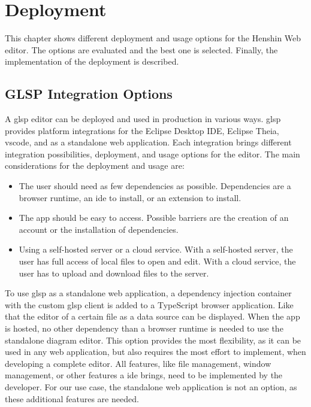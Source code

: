 \chapter{Deployment}
\label{sec:deployment}

This chapter shows different deployment and usage options for the Henshin Web editor. The options are evaluated and the best one is selected. Finally, the implementation of the deployment is described.

\section{GLSP Integration Options}
\label{sec:integration-options}
A \ac{glsp} editor can be deployed and used in production in various ways. \ac{glsp} provides platform integrations for the Eclipse Desktop IDE, Eclipse Theia, \ac{vscode}, and as a standalone web application. Each integration brings different integration possibilities, deployment, and usage options for the editor. \cite{glsp-doc} The main considerations for the deployment and usage are:
  \begin{itemize}
    \item The user should need as few dependencies as possible. Dependencies are a browser runtime, an \acs{ide} to install, or an extension to install.
    \item The app should be easy to access. Possible barriers are the creation of an account or the installation of dependencies.
    \item Using a self-hosted server or a cloud service. With a self-hosted server, the user has full access of local files to open and edit. With a cloud service, the user has to upload and download files to the server.
  \end{itemize}
  
  To use \ac{glsp} as a standalone web application, a dependency injection container with the custom \ac{glsp} client is added to a TypeScript browser application. Like that the editor of a certain file as a data source can be displayed. When the app is hosted, no other dependency than a browser runtime is needed to use the standalone diagram editor. \cite{glsp-client-repo} This option provides the most flexibility, as it can be used in any web application, but also requires the most effort to implement, when developing a complete editor. All features, like file management, window management, or other features a \acs{ide} brings, need to be implemented by the developer. \cite{glsp-client-repo} For our use case, the standalone web application is not an option, as these additional features are needed. 

